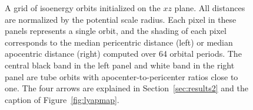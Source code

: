 \documentclass[letterpaper,12pt,preprint]{aastex}
\begin{document}
\begin{figure}[p]
\centering
\caption{ A grid of isoenergy orbits initialized on the $xz$ plane. All distances are normalized by the potential scale radius. Each pixel in these panels represents a single orbit, and the shading of each pixel corresponds to the median pericentric distance (left) or median apocentric distance (right) computed over 64 orbital periods. The central black band in the left panel and white band in the right panel are tube orbits with apocenter-to-pericenter ratios close to one. The four arrows are explained in Section~\ref{sec:results2} and the caption of Figure~\ref{fig:lyapmap}.}
\label{fig:apoper}
\end{figure}
\end{document}
